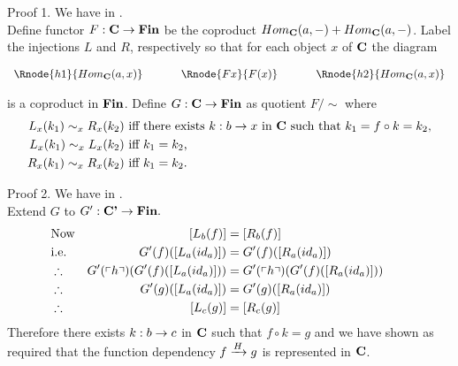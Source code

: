 \begin{frame}{Proof 1.}
We have \fgsourcediagram in \catc.\\
\medskip
Define functor $F: \catc \morph \Fin$ be the coproduct $Hom_{\catc}(a,-) + Hom_{\catc}(a,-)$.
Label the injections $L$ and $R$, respectively so that
for each object $x$ of $\catc$ the diagram
\begin{center}
$
\begin{array}{c p{0.5cm} c p{0.5cm} c  }
\Rnode{h1}{Hom_{\catc}(a,x)}  &&\Rnode{Fx}{F(x)}  &&   \Rnode{h2}{Hom_{\catc}(a,x)}       
\end{array} 
$
\end{center}
is a coproduct in $\Fin$.
\medskip
Define $G: \catc \morph \Fin$ as quotient $F/\sim$ where
\begin{align*}
L_x(k_1) \sim_x R_x(k_2) & \mbox{ iff there exists $k:b \morph x$ in $\catc$ such that $k_1 = f \circ k = k_2$,}\\
L_x(k_1) \sim_x L_x(k_2) & \mbox{ iff $k_1 = k_2$,} \\
R_x(k_1) \sim_x R_x(k_2) & \mbox{ iff $k_1 = k_2$.} \\
\end{align*} 
\end{frame}

\begin{frame}{Proof 2.}
We have   in \catcp.\\
\medskip
Extend $G$ to $G':\catcp \morph \Fin.$ \\

\medskip
\begin{align*}
&\mbox{Now} & [L_b(f)]                         &= [R_b(f)]                 \\
&\mbox{i.e.}& G'(f)([L_a(id_a)])              &= G'(f)([R_a(id_a)])       \\
&\therefore & G'(\qq{h}) (G'(f)([L_a(id_a)])) &= G'(\qq{h}) (G'(f)([R_a(id_a)])) \\
&\therefore & G'(g)([L_a(id_a)])              &= G'(g)([R_a(id_a)]) & &    \\
&\therefore & [L_c(g)]                        &= [R_c(g)] 
\end{align*}
Therefore there exists $k:b \morph c$ in 
$\catc$ such that $f \circ k = g$ and we have shown as required that the function dependency
$\fundep{H}{f}{g}$ is represented in $\catc$.
\end{frame}

